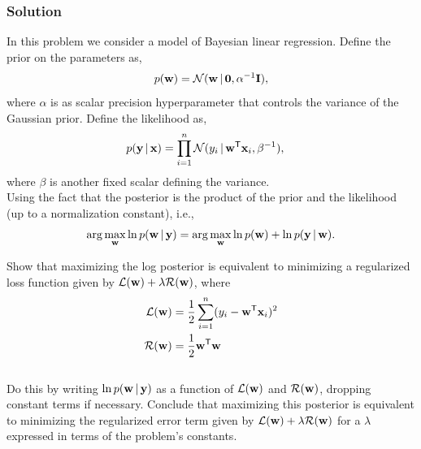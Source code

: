 \documentclass[submit]{harvardml}
\begin{document}
	\subsubsection*{Solution}
	
	
	
	
	
	
	
	
	
	
	
	\newpage
	\begin{problem}
		In this problem we consider a model of Bayesian linear regression. Define the prior on the parameters as,
		\begin{align*}
		p(\mathbf{w}) = \mathcal{N}(\mathbf{w} \,|\, \bold0, \alpha^{-1}\mathbf{I} ),
		\end{align*}
		where $\alpha$ is as scalar precision hyperparameter that controls the variance of the Gaussian prior.  Define the likelihood as,
		\begin{align*}
		p(\mathbf{y} \,|\, \mathbf{x}) &= \prod_{i=1}^n \mathcal{N}(y_i \,|\, \mathbf{w}^{\mathsf{T}} \mathbf{x}_i, \beta^{-1}),
		\end{align*}
		where $\beta$ is another fixed scalar defining the variance. \\
		
		
		\noindent Using the fact that the posterior is the product of the prior and the likelihood (up to a normalization constant), i.e., 
		\[\arg\max_{\mathbf{w}} \ln p(\mathbf{w} \,|\, \mathbf{y})= \arg\max_{\mathbf{w}} \ln p(\mathbf{w}) + \ln p(\mathbf{y} \,|\, \mathbf{w}).\]
		
		\noindent Show that maximizing the log posterior is equivalent to minimizing a regularized loss function given by ${\mathcal{L}(\mathbf{w}) + \lambda \mathcal{R}(\mathbf{w})}$, where
		\begin{align*}
		\mathcal{L}(\mathbf{w}) &= \frac{1}{2}\sum_{i = 1}^n (y_i - \mathbf{w}^{\mathsf{T}} \mathbf{x}_i)^2 \\
		\mathcal{R}(\mathbf{w}) &= \frac{1}{2}\mathbf{w}^{\mathsf{T}} \mathbf{w}
		\end{align*} \\
		
		\noindent Do this by writing $\ln p(\mathbf{w} \,|\, \mathbf{y})$ as a function of $\mathcal{L}(\mathbf{w})$ and $\mathcal{R}(\mathbf{w})$, dropping constant terms if necessary.  Conclude that maximizing this posterior is equivalent to minimizing the regularized error term given by $\mathcal{L}(\mathbf{w}) + \lambda \mathcal{R}(\mathbf{w})$ for a $\lambda$ expressed in terms of the problem's constants.  
	\end{problem}
	
\end{document}
